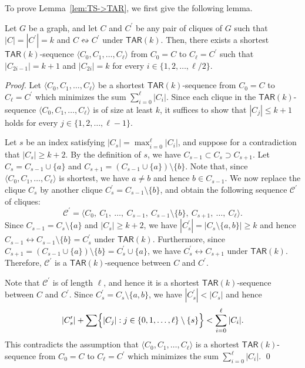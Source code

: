 \documentclass{llncs}
\newcommand{\onestep}{\leftrightarrow}
\newcommand{\sevstep}{\leftrightsquigarrow}
\newcommand{\TAR}[1]{\mathsf{TAR}(#1)}
\newcommand{\cliq}{C}
\newcounter{one}
\begin{document}
	To prove Lemma~\ref{lem:TS->TAR}, we first give the following lemma.	
	\begin{lemma} \label{lem:ar<=k+1}
	Let $G$ be a graph, and let $\cliq$ and $\cliq^\prime$ be any pair of cliques of $G$ such that $|\cliq| = |\cliq^\prime| = k$ and $\cliq \sevstep \cliq^\prime$ under $\TAR{k}$.
	Then, there exists a shortest $\TAR{k}$-sequence $\langle \cliq_{0}, \cliq_{1}, \dots, \cliq_{\ell} \rangle$ from $\cliq_{0} = \cliq$ to $\cliq_{\ell} = \cliq^\prime$ such that $|\cliq_{2i-1}| = k+1$ and $|\cliq_{2i}| = k$ for every $i \in \{1, 2, \ldots, \ell/2 \}$.
	\end{lemma}
	\begin{proof}
	Let $\langle \cliq_{0}, \cliq_{1}, \dots, \cliq_{\ell} \rangle$ be a shortest $\TAR{k}$-sequence from $\cliq_{0} = \cliq$ to $\cliq_{\ell} = \cliq^\prime$ which minimizes the sum $\sum_{i=0}^{\ell} |\cliq_{i}|$.
Since each clique in the $\TAR{k}$-sequence $\langle \cliq_{0}, \cliq_{1}, \dots, \cliq_{\ell} \rangle$ is of size at least $k$, it suffices to show that $|C_{j}| \le k+1$ holds for every $j \in \{1,2,\ldots,\ell-1\}$.

	Let $s$ be an index satisfying $|\cliq_{s}| = \max_{i=0}^{\ell} |\cliq_{i}|$, and suppose for a contradiction that $|\cliq_{s}| \ge k + 2$.
	By the definition of $s$, we have $\cliq_{s-1} \subset \cliq_{s} \supset \cliq_{s+1}$.
	Let $\cliq_{s} = \cliq_{s-1} \cup \{a\}$ and $\cliq_{s+1} = (\cliq_{s-1} \cup \{a\}) \setminus \{b\}$.
	Note that, since $\langle \cliq_{0}, \cliq_{1}, \dots, \cliq_{\ell} \rangle$ is shortest, we have $a \neq b$ and hence $b \in \cliq_{s-1}$.
	We now replace the clique $\cliq_{s}$ by another clique $\cliq_{s}^\prime = \cliq_{s-1} \setminus \{b\}$, and obtain the following sequence $\mathcal{C}^\prime$ of cliques:
	\[
		\mathcal{C}^\prime = \langle \cliq_{0},\ \cliq_{1},\ \ldots,\ \cliq_{s-1},\ \cliq_{s-1} \setminus \{b\},\ \cliq_{s+1},\ \ldots,\ \cliq_{\ell} \rangle.
	\]
	Since $\cliq_{s-1} = \cliq_{s} \setminus \{a\}$ and $|\cliq_s| \ge k+2$, we have $|\cliq_{s}^\prime| = |\cliq_{s} \setminus \{a, b\}| \ge k$ and hence $\cliq_{s-1} \onestep \cliq_{s-1} \setminus \{b\} = \cliq_{s}^\prime$ under $\TAR{k}$.
	Furthermore, since $\cliq_{s+1} = (\cliq_{s-1} \cup \{a\}) \setminus \{b\} = \cliq_{s}^\prime \cup \{a\}$, we have $\cliq_{s}^\prime \onestep \cliq_{s+1}$ under $\TAR{k}$. 
	Therefore, $\mathcal{C}^\prime$ is a $\TAR{k}$-sequence between $\cliq$ and $\cliq^\prime$.

	Note that $\mathcal{C}^\prime$ is of length $\ell$, and hence it is a shortest $\TAR{k}$-sequence between $\cliq$ and $\cliq^\prime$.
	Since $\cliq_{s}^\prime = \cliq_{s} \setminus \{a, b\}$, we have $|\cliq_s^\prime| < |\cliq_s|$ and hence 
	\[
		|\cliq_s^\prime| + \sum \Bigl\{ |\cliq_{j}| : j \in \{0, 1, \ldots, \ell\} \setminus \{ s\}  \Bigr\} < \sum_{i=0}^{\ell} |\cliq_{i}|.
	\]
	This contradicts the assumption that $\langle \cliq_{0}, \cliq_{1}, \dots, \cliq_{\ell} \rangle$ is a shortest $\TAR{k}$-sequence from $\cliq_{0} = \cliq$ to $\cliq_{\ell} = \cliq^\prime$ which minimizes the sum $\sum_{i=0}^{\ell} |\cliq_{i}|$.
	\qed
	\end{proof}
\medskip
\end{document}
